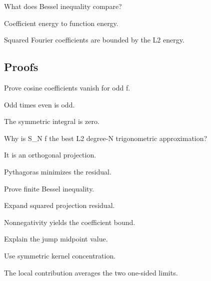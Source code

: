 \begin{exercise}[Bessel]\label{exr:iii09-expand-05}
What does Bessel inequality compare?
\end{exercise}
\begin{hint}
Coefficient energy to function energy.
\end{hint}
\begin{solution}
Squared Fourier coefficients are bounded by the L2 energy.
\end{solution}

\subsection*{Proofs}

\begin{exercise}\label{exr:iii09-expand-06}
Prove cosine coefficients vanish for odd f.
\end{exercise}
\begin{hint}
Odd times even is odd.
\end{hint}
\begin{solution}
The symmetric integral is zero.
\end{solution}

\begin{exercise}[Projection]\label{exr:iii09-expand-07}
Why is S\_N f the best L2 degree-N trigonometric approximation?
\end{exercise}
\begin{hint}
It is an orthogonal projection.
\end{hint}
\begin{solution}
Pythagoras minimizes the residual.
\end{solution}

\begin{exercise}\label{exr:iii09-expand-08}
Prove finite Bessel inequality.
\end{exercise}
\begin{hint}
Expand squared projection residual.
\end{hint}
\begin{solution}
Nonnegativity yields the coefficient bound.
\end{solution}

\begin{exercise}\label{exr:iii09-expand-09}
Explain the jump midpoint value.
\end{exercise}
\begin{hint}
Use symmetric kernel concentration.
\end{hint}
\begin{solution}
The local contribution averages the two one-sided limits.
\end{solution}


